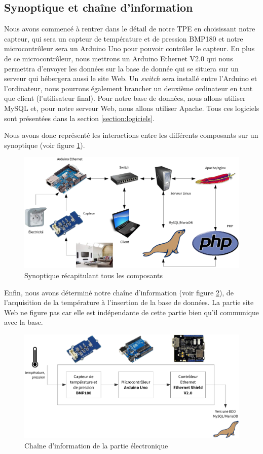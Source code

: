 \subsection{Synoptique et chaîne d'information}

Nous avons commencé à rentrer dans le détail de notre TPE en choisissant notre capteur, qui sera un capteur de température et de pression BMP180 et notre microcontrôleur sera un Arduino Uno pour pouvoir contrôler le capteur. En plus de ce microcontrôleur, nous mettrons un Arduino Ethernet V2.0 qui nous permettra d'envoyer les données sur la base de donnée qui se situera sur un serveur qui hébergera aussi le site Web. Un \emph{switch} sera installé entre l'Arduino et l'ordinateur, nous pourrons également brancher un deuxième ordinateur en tant que client (l'utilisateur final). Pour notre base de données, nous allons utiliser MySQL et, pour notre serveur Web, nous allons utiliser Apache. Tous ces logiciels sont présentées dans la section \ref{section:logiciels}.

Nous avons donc représenté les interactions entre les différents composants sur un synoptique (voir figure \ref{figure:synoptique}).

\begin{figure}[!h]
	\centering
	\includegraphics[width=.9\linewidth]{Images/Synoptique}
	\caption{Synoptique récapitulant tous les composants}
	\label{figure:synoptique}
\end{figure}

Enfin, nous avons déterminé notre chaîne d'information (voir figure \ref{figure:ci}), de l'acquisition de la température à l'insertion de la base de données. La partie site Web ne figure pas car elle est indépendante de cette partie bien qu'il communique avec la base.

\begin{figure}[!h]
	\centering
	\includegraphics[width=.9\linewidth]{Images/Chaine_information}
	\caption{Chaîne d'information de la partie électronique}
	\label{figure:ci}
\end{figure}
